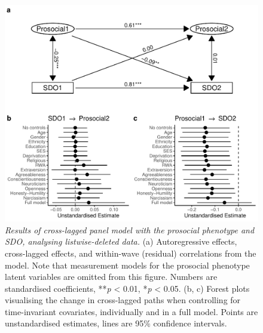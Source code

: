 \documentclass[
  man,floatsintext]{apa6}
\begin{document}
\newpage











\begin{figure}
\centering
\includegraphics{manuscript_files/figure-latex/clpmPlotSDOdReduced-1.pdf}
\caption{\label{fig:clpmPlotSDOdReduced}\emph{Results of cross-lagged panel model with the
prosocial phenotype and SDO, analysing listwise-deleted data.} (a)
Autoregressive effects, cross-lagged effects, and within-wave (residual)
correlations from the model. Note that measurement models for the prosocial
phenotype latent variables are omitted from this figure. Numbers are
standardised coefficients, **\emph{p} \textless{} 0.01, *\emph{p} \textless{} 0.05. (b, c) Forest plots
visualising the change in cross-lagged paths when controlling for time-invariant
covariates, individually and in a full model. Points are unstandardised
estimates, lines are 95\% confidence intervals.}
\end{figure}

\newpage
\end{document}

